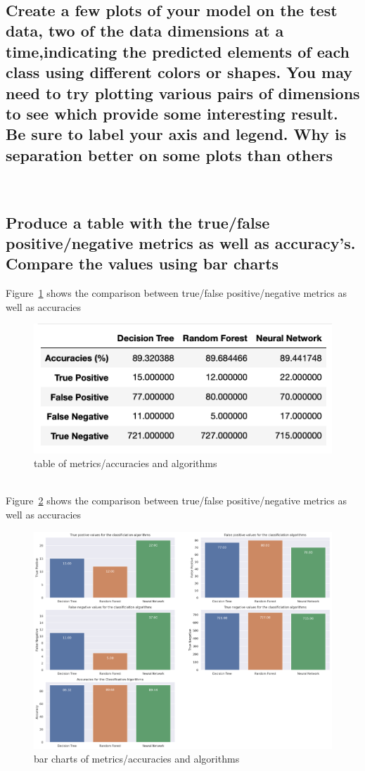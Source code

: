 \\
\subsection{Create a few plots of your model on the test data, two of the data dimensions at a time,indicating the predicted elements of each class using different colors or shapes. You may need to try plotting various pairs of dimensions to see which provide some interesting result. Be sure to label your axis and legend. Why is separation better on some plots than others}

\\



\subsection{Produce a table with the true/false positive/negative metrics as well as accuracy's. Compare the values using bar charts}

Figure~\ref{fig:fig4} shows the comparison between true/false positive/negative metrics as well as accuracies
\begin{figure}[!ht]
 \centering
\includegraphics[width=6.1in]{assignment2/1-5_table.png}
\caption{\label{fig:fig4}table of metrics/accuracies and algorithms}
\end{figure}
\\
Figure~\ref{fig:fig5} shows the comparison between true/false positive/negative metrics as well as accuracies
\begin{figure}[!ht]
 \centering
\includegraphics[width=6.1in]{assignment2/80-20_barcharts_algorithms.png}
\caption{\label{fig:fig5}bar charts of metrics/accuracies and algorithms}
\end{figure}


